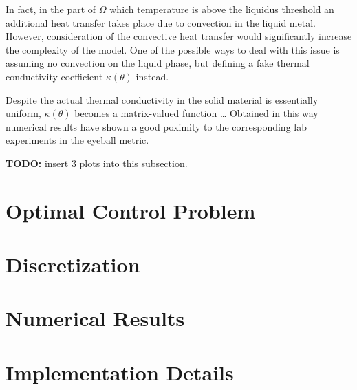 In fact, in the part of $\Omega$ which temperature is above the liquidus threshold an additional heat transfer takes place due to convection in the liquid metal. However, consideration of the convective heat transfer would significantly increase the complexity of the model. One of the possible ways to deal with this issue is assuming no convection on the liquid phase, but defining a fake thermal conductivity coefficient $\kappa(\theta)$ instead.

{\color{TolHighContrastBlue}
Despite the actual thermal conductivity in the solid material is essentially uniform, $\kappa(\theta)$ becomes a matrix-valued function \ldots
Obtained in this way numerical results have shown a good poximity to the corresponding lab experiments in the eyeball metric.

\textbf{TODO:} insert 3 plots into this subsection.
}

\section{Optimal Control Problem}
\label{sec:objective}

\section{Discretization}
\label{sec:discretization}

\section{Numerical Results}
\label{sec:numerical_results}

\appendix

\section{Implementation Details}
